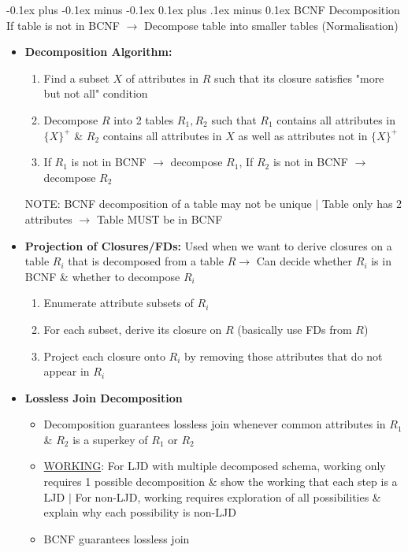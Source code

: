 \documentclass[landscape]{article}
\makeatletter
\renewcommand{\subsection}{\@startsection{subsection}{2}{0mm}%
  {-0.1ex plus -0.1ex minus -0.1ex}%
  {0.1ex plus .1ex minus 0.1ex}%
{\normalfont\scriptsize\bfseries}}
\makeatother
\begin{document}
\begin{multicols*}{5}
    \subsection{BCNF Decomposition}
    If table is not in BCNF $\rightarrow$ Decompose table into smaller tables (Normalisation)
    \begin{itemize}
      \item \textbf{Decomposition Algorithm:}
      \begin{enumerate}
        \item Find a subset $X$ of attributes in $R$ such that its closure satisfies "more but not all" condition
        \item Decompose $R$ into 2 tables $R_1, R_2$ such that $R_1$ contains all attributes in $\{X\}^{+}$ \& $R_2$ contains all attributes in $X$ as well as attributes not in $\{X\}^{+}$
        \item If $R_1$ is not in BCNF $\rightarrow$ decompose $R_1$, If $R_2$ is not in BCNF $\rightarrow$ decompose $R_2$ 
      \end{enumerate}
    NOTE: BCNF decomposition of a table may not be unique $\vert$ Table only has 2 attributes $\rightarrow$ Table MUST be in BCNF
    \item \textbf{Projection of Closures/FDs:} Used when we want to derive closures on a table $R_i$ that is decomposed from a table $R \rightarrow$ Can decide whether $R_i$ is in BCNF \& whether to decompose $R_i$
    \begin{enumerate}
      \item Enumerate attribute subsets of $R_i$
      \item For each subset, derive its closure on $R$ (basically use FDs from $R$)
      \item Project each closure onto $R_i$ by removing those attributes that do not appear in $R_i$
    \end{enumerate}
    \item \textbf{Lossless Join Decomposition}
    \begin{itemize}
      \item Decomposition guarantees lossless join whenever common attributes in $R_1$ \& $R_2$ is a superkey of  $R_1$ or $R_2$
      \item \underline{WORKING}: For LJD with multiple decomposed schema, working only requires 1 possible decomposition \& show the working that each step is a LJD $\vert$ For non-LJD, working requires exploration of all possibilities \& explain why each possibility is non-LJD 
      \item BCNF guarantees lossless join
    \end{itemize}
    \end{itemize}


\end{multicols*}
\end{document}
